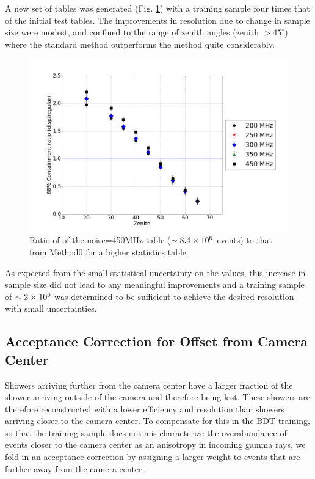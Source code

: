 \documentclass[main.tex]{subfiles}
\begin{document}
A new set of \disp tables was generated (Fig. \ref{fig:disp_ratio_450x4}) with a training sample four times that of the initial test tables. The improvements in resolution due to change in sample size were modest, and confined to the range of zenith angles (zenith $>45^\circ$) where the standard method outperforms the \disp method quite considerably.

\begin{figure}[htbp]
  \centering
  \includegraphics[width=0.8\linewidth]{images/disp_450x4size_ratio_xzen}
  \caption[Higher statistics \disp table reconstruction vs noise.]{Ratio of \rse of the noise=450MHz \disp table ($\sim 8.4\times 10^{6}$ events) to that from Method0 for a higher statistics \disp table.}
  \label{fig:disp_ratio_450x4}
\end{figure}

As expected from the small statistical uncertainty on the \rse values, this increase in sample size did not lead to any meaningful improvements and a training sample of $\sim 2\times 10^{6}$ was determined to be sufficient to achieve the desired resolution with small uncertainties.

\subsection{Acceptance Correction for Offset from Camera Center}
Showers arriving further from the camera center have a larger fraction of the shower arriving outside of the camera and therefore being lost. These showers are therefore reconstructed with a lower efficiency and resolution than showers arriving closer to the camera center. To compensate for this in the BDT training, so that the training sample does not mis-characterize the overabundance of events closer to the camera center as an anisotropy in incoming gamma rays, we fold in an acceptance correction by assigning a larger weight to events that are further away from the camera center.
\end{document}
